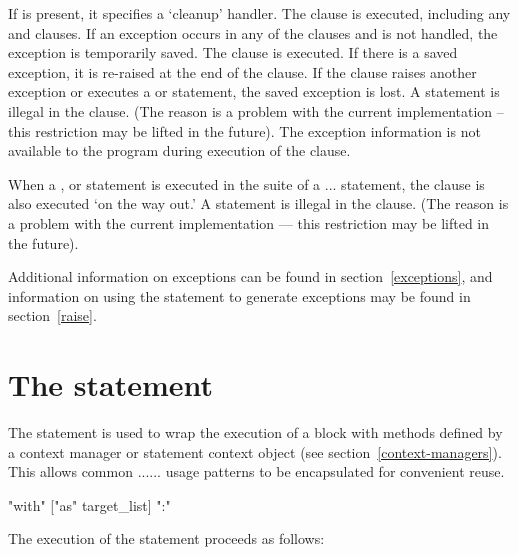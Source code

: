If  is present, it specifies a `cleanup' handler.  The
 clause is executed, including any  and
 clauses.  If an exception occurs in any of the clauses
and is not handled, the exception is temporarily saved. The
 clause is executed.  If there is a saved exception,
it is re-raised at the end of the  clause.
If the  clause raises another exception or
executes a  or  statement, the saved
exception is lost.  A  statement is illegal in the
 clause.  (The reason is a problem with the current
implementation -- this restriction may be lifted in the future).  The
exception information is not available to the program during execution of
the  clause.

When a ,  or  statement is
executed in the  suite of a ...
statement, the  clause is also executed `on the way out.' A
 statement is illegal in the  clause.
(The reason is a problem with the current implementation --- this
restriction may be lifted in the future).

Additional information on exceptions can be found in
section~\ref{exceptions}, and information on using the 
statement to generate exceptions may be found in section~\ref{raise}.


\section{The  statement\label{with}}


The  statement is used to wrap the execution of a block
with methods defined by a context manager or  statement context
object (see section~\ref{context-managers}). This allows common
...... usage patterns to
be encapsulated for convenient reuse.

\begin{productionlist}
  {"with"  ["as" target_list] ":" }
\end{productionlist}

The execution of the  statement proceeds as follows:

